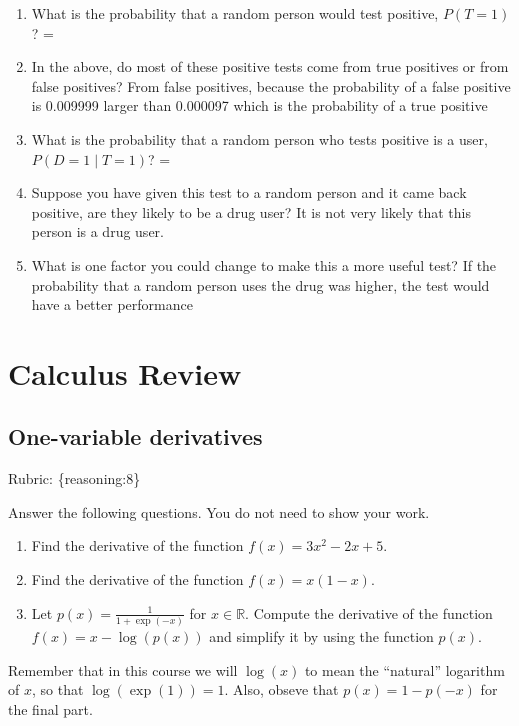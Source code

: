 \documentclass{article}
\def\rubric#1{\gre{Rubric: \{#1\}}}{}
\def\blu#1{{\color{blu}#1}}
\def\gre#1{{\color{gre}#1}}
\def\ans#1{{\color{ans}#1}}
\def\R{\mathbb{R}}
\begin{document}
\begin{enumerate}
\item What is the probability that a random person would test positive, $P(T=1)$? \ans{ = }
\item In the above, do most of these positive tests come from true positives or from false positives?
\ans{From false positives, because the probability of a false positive is 0.009999 larger than 0.000097 which is the probability of a true positive}
\item What is the probability that a random person who tests positive is a user, $P(D=1 \mid T=1)$? \ans{ = }
\item Suppose you have given this test to a random person and it came back positive, are they likely to be a drug user? \ans{It is not very likely that this person is a drug user.}
\item What is one factor you could change to make this a more useful test? \ans{If the probability that a random person uses the drug was higher, the test would have a better performance}
\end{enumerate}


\section{Calculus Review}



\subsection{One-variable derivatives}
\label{sub.one.var}
\rubric{reasoning:8}

\blu{Answer the following questions.} You do not need to show your work.

\begin{enumerate}
\item Find the derivative of the function $f(x) = 3x^2 -2x + 5$. \ans{}
\item Find the derivative of the function $f(x) = x(1-x)$. \ans{}
\item Let $p(x) = \frac{1}{1+\exp(-x)}$ for $x \in \R$. Compute the derivative of the function $f(x) = x-\log(p(x))$ and simplify it by using the function $p(x)$. \ans{}
\end{enumerate}
Remember that in this course we will $\log(x)$ to mean the ``natural'' logarithm of $x$, so that $\log(\exp(1)) = 1$. Also, obseve that $p(x) = 1-p(-x)$ for the final part.
\end{document}

